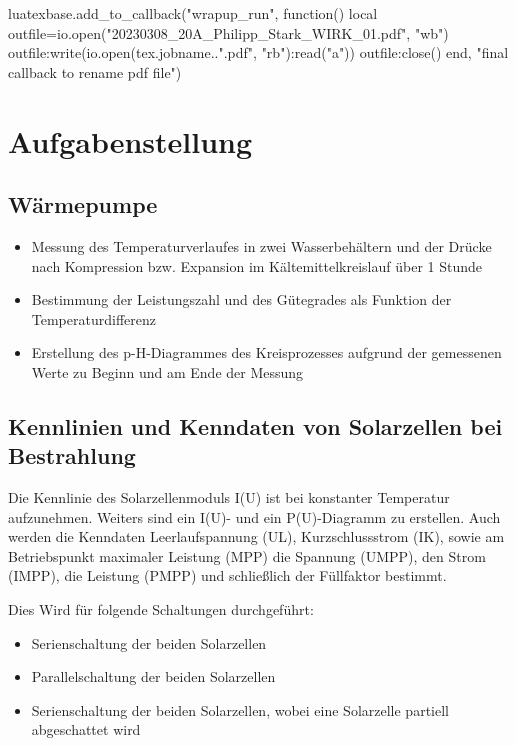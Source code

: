 \documentclass[12pt,english,ngerman]{scrartcl}
\begin{document}
\begin{luacode*}
	luatexbase.add_to_callback("wrapup_run", function()
	local outfile=io.open("20230308_20A_Philipp_Stark_WIRK_01.pdf", "wb")
	outfile:write(io.open(tex.jobname..".pdf", "rb"):read("a"))
	outfile:close()
	end, "final callback to rename pdf file")
\end{luacode*}

% 
\tableofcontents

\newpage

\section{Aufgabenstellung\label{Auf}}

\subsection{Wärmepumpe}

\begin{itemize}
	\item Messung des Temperaturverlaufes in zwei Wasserbehältern und der Drücke nach Kompression bzw. Expansion im
	      Kältemittelkreislauf über 1 Stunde
	\item Bestimmung der Leistungszahl und des Gütegrades als Funktion der
	      Temperaturdifferenz
	\item Erstellung des p-H-Diagrammes des Kreisprozesses aufgrund der gemessenen Werte
	      zu Beginn und am Ende der Messung \cite{unterlagen_warmepumpe}
\end{itemize}
\subsection{Kennlinien und Kenndaten von Solarzellen bei Bestrahlung}

Die Kennlinie des Solarzellenmoduls I(U) ist bei konstanter Temperatur
aufzunehmen. Weiters sind ein I(U)- und ein P(U)-Diagramm zu erstellen. Auch
werden die Kenndaten Leerlaufspannung (UL), Kurzschlussstrom (IK), sowie am
Betriebspunkt maximaler Leistung (MPP) die Spannung (UMPP), den Strom (IMPP),
die Leistung (PMPP) und schließlich der Füllfaktor bestimmt.

Dies Wird für folgende Schaltungen durchgeführt:

\begin{itemize}
	\item Serienschaltung der beiden Solarzellen
	\item Parallelschaltung der beiden Solarzellen
	\item Serienschaltung der beiden Solarzellen, wobei eine Solarzelle partiell
	      abgeschattet wird
\end{itemize}
\end{document}
